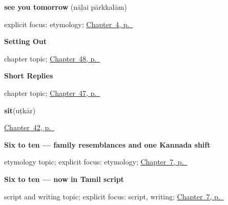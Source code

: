 \noindent\begin{minipage}[t]{\linewidth}
\raggedright
\textbf{see you tomorrow}\enspace\emph{ }\enspace(nāḷai pārkkalām)\par
\footnotesize explicit focus: etymology; \hyperref[ch:farewells]{Chapter~4, p.~\pageref*{ch:farewells}}
\end{minipage}\par\smallskip

\noindent\begin{minipage}[t]{\linewidth}
\raggedright
\textbf{Setting Out}\par
\footnotesize chapter topic; \hyperref[ch:ta-setting-out]{Chapter~48, p.~\pageref*{ch:ta-setting-out}}
\end{minipage}\par\smallskip

\noindent\begin{minipage}[t]{\linewidth}
\raggedright
\textbf{Short Replies}\par
\footnotesize chapter topic; \hyperref[ch:ta-replies]{Chapter~47, p.~\pageref*{ch:ta-replies}}
\end{minipage}\par\smallskip

\noindent\begin{minipage}[t]{\linewidth}
\raggedright
\textbf{sit}\enspace\emph{}\enspace(uṭkār)\par
\footnotesize \hyperref[ch:ta-more-verbs]{Chapter~42, p.~\pageref*{ch:ta-more-verbs}}
\end{minipage}\par\smallskip

\noindent\begin{minipage}[t]{\linewidth}
\raggedright
\textbf{Six to ten — family resemblances and one Kannada shift}\par
\footnotesize etymology topic; explicit focus: etymology; \hyperref[ch:ta-numbers-one-to-ten]{Chapter~7, p.~\pageref*{ch:ta-numbers-one-to-ten}}
\end{minipage}\par\smallskip

\noindent\begin{minipage}[t]{\linewidth}
\raggedright
\textbf{Six to ten — now in Tamil script}\par
\footnotesize script and writing topic; explicit focus: script, writing; \hyperref[ch:ta-numbers-one-to-ten]{Chapter~7, p.~\pageref*{ch:ta-numbers-one-to-ten}}
\end{minipage}\par\smallskip

